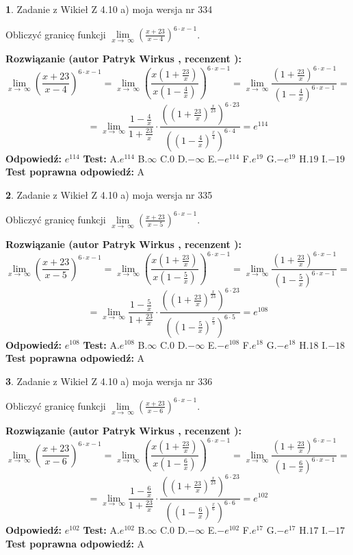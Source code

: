 \documentclass[12pt, a4paper]{article}
\theoremstyle{definition} %
\newtheorem{zad}{}
\newcommand{\zadStart}[1]{\begin{zad}#1\newline}
\newcommand{\zadStop}{\end{zad}}
\newcommand{\rozwStart}[2]{\noindent \textbf{Rozwiązanie (autor #1 , recenzent #2): }\newline}
\newcommand{\rozwStop}{\newline}
\newcommand{\odpStart}{\noindent \textbf{Odpowiedź:}\newline}
\newcommand{\odpStop}{\newline}
\newcommand{\testStart}{\noindent \textbf{Test:}\newline}
\newcommand{\testStop}{\newline}
\newcommand{\kluczStart}{\noindent \textbf{Test poprawna odpowiedź:}\newline}
\newcommand{\kluczStop}{\newline}
\begin{document}
\zadStart{Zadanie z Wikieł Z 4.10 a) moja wersja nr 334}

Obliczyć granicę funkcji  $\lim\limits_{x\to\ \infty}(\frac{x+23}{x-4})^{6\cdot x-1}$.
\zadStop
\rozwStart{Patryk Wirkus}{}
$$\lim\limits_{x\to\ \infty}(\frac{x+23}{x-4})^{6\cdot x-1} = \lim\limits_{x\to\ \infty}(\frac{x(1+\frac{23}{x})}{x(1-\frac{4}{x})})^{6\cdot x-1}=\lim\limits_{x\to\ \infty}\frac{(1+\frac{23}{x})^{6\cdot x-1}}{(1-\frac{4}{x})^{6\cdot x-1}}=$$
$$=\lim\limits_{x\to\ \infty}\frac{1-\frac{4}{x}}{1+\frac{23}{x}}\cdot\frac{((1+\frac{23}{x})^{\frac{x}{23}})^{6\cdot23}}{((1-\frac{4}{x})^{\frac{x}{4}})^{6\cdot4}}=e^{114}$$
\rozwStop
\odpStart
$e^{114}$
\odpStop
\testStart
A.$e^{114}$ B.$\infty$ C.$0$ D.$-\infty$ E.$-e^{114}$
F.$e^{19}$ G.$-e^{19}$
H.$19$
I.$-19$
\testStop
\kluczStart
A
\kluczStop



\zadStart{Zadanie z Wikieł Z 4.10 a) moja wersja nr 335}

Obliczyć granicę funkcji  $\lim\limits_{x\to\ \infty}(\frac{x+23}{x-5})^{6\cdot x-1}$.
\zadStop
\rozwStart{Patryk Wirkus}{}
$$\lim\limits_{x\to\ \infty}(\frac{x+23}{x-5})^{6\cdot x-1} = \lim\limits_{x\to\ \infty}(\frac{x(1+\frac{23}{x})}{x(1-\frac{5}{x})})^{6\cdot x-1}=\lim\limits_{x\to\ \infty}\frac{(1+\frac{23}{x})^{6\cdot x-1}}{(1-\frac{5}{x})^{6\cdot x-1}}=$$
$$=\lim\limits_{x\to\ \infty}\frac{1-\frac{5}{x}}{1+\frac{23}{x}}\cdot\frac{((1+\frac{23}{x})^{\frac{x}{23}})^{6\cdot23}}{((1-\frac{5}{x})^{\frac{x}{5}})^{6\cdot5}}=e^{108}$$
\rozwStop
\odpStart
$e^{108}$
\odpStop
\testStart
A.$e^{108}$ B.$\infty$ C.$0$ D.$-\infty$ E.$-e^{108}$
F.$e^{18}$ G.$-e^{18}$
H.$18$
I.$-18$
\testStop
\kluczStart
A
\kluczStop



\zadStart{Zadanie z Wikieł Z 4.10 a) moja wersja nr 336}

Obliczyć granicę funkcji  $\lim\limits_{x\to\ \infty}(\frac{x+23}{x-6})^{6\cdot x-1}$.
\zadStop
\rozwStart{Patryk Wirkus}{}
$$\lim\limits_{x\to\ \infty}(\frac{x+23}{x-6})^{6\cdot x-1} = \lim\limits_{x\to\ \infty}(\frac{x(1+\frac{23}{x})}{x(1-\frac{6}{x})})^{6\cdot x-1}=\lim\limits_{x\to\ \infty}\frac{(1+\frac{23}{x})^{6\cdot x-1}}{(1-\frac{6}{x})^{6\cdot x-1}}=$$
$$=\lim\limits_{x\to\ \infty}\frac{1-\frac{6}{x}}{1+\frac{23}{x}}\cdot\frac{((1+\frac{23}{x})^{\frac{x}{23}})^{6\cdot23}}{((1-\frac{6}{x})^{\frac{x}{6}})^{6\cdot6}}=e^{102}$$
\rozwStop
\odpStart
$e^{102}$
\odpStop
\testStart
A.$e^{102}$ B.$\infty$ C.$0$ D.$-\infty$ E.$-e^{102}$
F.$e^{17}$ G.$-e^{17}$
H.$17$
I.$-17$
\testStop
\kluczStart
A
\kluczStop
\end{document}
